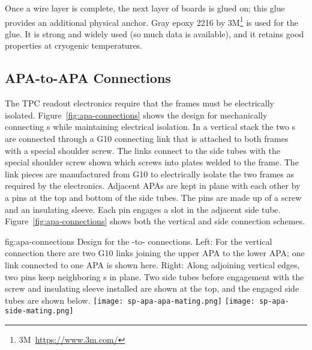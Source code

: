 Once a wire layer is complete, the next layer of boards is glued on; this glue provides an additional physical anchor. Gray epoxy \num{2216} by 3M\footnote{3M\texttrademark ~\url{https://www.3m.com/}} is used for the glue.  It is strong and widely used (so much data is available), and it retains good properties at cryogenic temperatures.  


\subsection{APA-to-APA Connections}
\label{sec:fdsp-apa-intfc-apa}

The TPC readout electronics require that the  frames must be electrically isolated.   Figure~\ref{fig:apa-connections} shows the design for mechanically connecting s while maintaining electrical isolation.  In a vertical stack the two s are connected through a G10 connecting link that is attached to both frames with a special shoulder screw.  The links connect to the side tubes with the special shoulder screw shown which screws into plates welded to the frame.  The link pieces are manufactured from G10 to electrically isolate the two frames as required by the  electronics. Adjacent APAs are kept in plane with each other by a pins at the top and bottom of the side tubes.  The pins are made up of a screw and an insulating sleeve.  Each pin engages a slot in the adjacent side tube. Figure~\ref{fig:apa-connections} shows both the vertical and side connection schemes. 

\begin{dunefigure}{fig:apa-connections}
{%
Design for the -to- connections.  Left: For the vertical connection there are two G10 links joining the upper APA to the lower APA; one link connected to one APA is shown here.  Right: Along adjoining vertical edges, two pins keep neighboring s in plane. Two side tubes before engagement with the screw and insulating sleeve installed are shown at the top, and the engaged side tubes are shown below.   }  
\texttt{[image: sp-apa-apa-mating.png]} \qquad
\texttt{[image: sp-apa-side-mating.png]}
\end{dunefigure}


